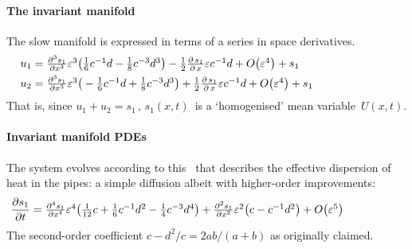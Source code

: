 \paragraph{The invariant manifold} 
The slow manifold is expressed in terms of a series in space
derivatives.
\begin{align*}&
u_{1}=\ParMath{ \frac{\partial ^{3}s_{1}}{\partial x^{3}} \eps^{3} \big(\frac{1}{6} c^{-1}
 d-\frac{1}{8} c^{-3} d^{3}\big)-\frac{1}{2} \frac{\partial \,s_{1}}{\partial \,x} \eps 
c^{-1} d+O\big(\varepsilon ^{4}\big)+s_{1}
}\\&
u_{2}=\ParMath{ \frac{\partial ^{3}s_{1}}{\partial x^{3}} \eps^{3} \big(-\frac{1}{6} c^{-1
} d+\frac{1}{8} c^{-3} d^{3}\big)+\frac{1}{2} \frac{\partial \,s_{1}}{\partial \,x} \eps
 c^{-1} d+O\big(\varepsilon ^{4}\big)+s_{1}
}\end{align*}
That is, since \(u_1+u_2=s_1\)\,, \(s_1(x,t)\)~is a
`homogenised' mean variable~\(U(x,t)\).

 
\paragraph{Invariant manifold PDEs} 
The system evolves according to this \pde\ that describes
the effective dispersion of heat in the pipes: a simple
diffusion albeit with higher-order improvements:
\begin{align*}&
\D t{s_{1}}=\ParMath{ \frac{\partial ^{4}s_{1}}{\partial x^{4}} \eps^{4} \big(\frac{1}{12} 
c+\frac{1}{6} c^{-1} d^{2}-\frac{1}{4} c^{-3} d^{4}\big)+\frac{\partial ^{2}s_{1}}{
\partial x^{2}} \eps^{2} \big(c-c^{-1} d^{2}\big)+O\big(\varepsilon ^{5}
\big)
}\end{align*}
The second-order coefficient \(c-d^2/c=2ab/(a+b)\) as originally claimed.



